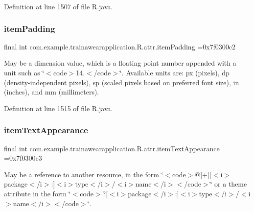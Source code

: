 Definition at line 1507 of file R.\+java.

\mbox{\label{classcom_1_1example_1_1trainawearapplication_1_1_r_1_1attr_a6b6da39404562545f9f51cf78522189c}} 
\subsubsection{\texorpdfstring{itemPadding}{itemPadding}}
{\footnotesize\ttfamily final int com.\+example.\+trainawearapplication.\+R.\+attr.\+item\+Padding =0x7f0300c2\hspace{0.3cm}{\ttfamily [static]}}

May be a dimension value, which is a floating point number appended with a unit such as \char`\"{}$<$code$>$14.\+5sp$<$/code$>$\char`\"{}. Available units are\+: px (pixels), dp (density-\/independent pixels), sp (scaled pixels based on preferred font size), in (inches), and mm (millimeters). 

Definition at line 1515 of file R.\+java.

\mbox{\label{classcom_1_1example_1_1trainawearapplication_1_1_r_1_1attr_ae7ecd82e57ffd58e4377e7bcec9c6480}} 
\subsubsection{\texorpdfstring{itemTextAppearance}{itemTextAppearance}}
{\footnotesize\ttfamily final int com.\+example.\+trainawearapplication.\+R.\+attr.\+item\+Text\+Appearance =0x7f0300c3\hspace{0.3cm}{\ttfamily [static]}}

May be a reference to another resource, in the form \char`\"{}$<$code$>$@\mbox{[}+\mbox{]}\mbox{[}$<$i$>$package$<$/i$>$\+:\mbox{]}$<$i$>$type$<$/i$>$/$<$i$>$name$<$/i$>$$<$/code$>$\char`\"{} or a theme attribute in the form \char`\"{}$<$code$>$?\mbox{[}$<$i$>$package$<$/i$>$\+:\mbox{]}$<$i$>$type$<$/i$>$/$<$i$>$name$<$/i$>$$<$/code$>$\char`\"{}. 

